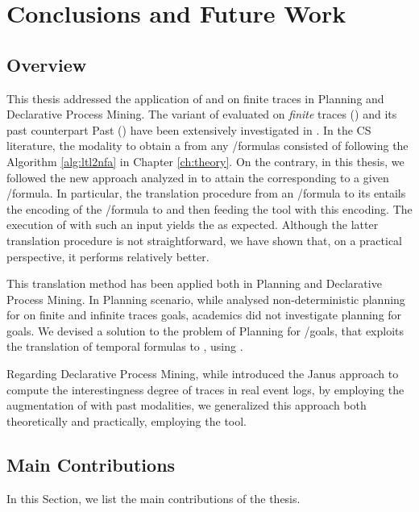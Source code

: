 \chapter{Conclusions and Future Work}\label{ch:conclusion}
\section{Overview}
This thesis addressed the application of \LTL and \PLTL on finite traces in Planning and Declarative Process Mining. The variant of \LTL evaluated on \textit{finite} traces (\LTLf) and its past counterpart  Past \LTL (\PLTL) have been extensively investigated in \cite{de2013linear,lichtenstein1985glory}. In the CS literature, the modality to obtain a \DFA from any \LTLf/\PLTL formulas consisted of following the Algorithm \ref{alg:ltl2nfa} in Chapter \ref{ch:theory}. On the contrary, in this thesis, we followed the new approach analyzed in \cite{zhu2017symbolic, zpv2018} to attain the corresponding \DFA to a given \LTLf/\PLTL formula. In particular, the translation procedure from an \LTLf/\PLTL formula to its \DFA entails the encoding of the \LTLf/\PLTL formula to \FOL and then feeding the \MONA tool with this encoding. The execution of \MONA with such an input yields the \DFA as expected. Although the latter translation procedure is not straightforward, we have shown that, on a practical perspective, it performs relatively better.

This translation method has been applied both in Planning and Declarative Process Mining. In Planning scenario, while \cite{camacho2017non} analysed non-deterministic planning for \LTL on finite and infinite traces goals, academics did not investigate planning for \PLTL goals. We devised a solution to the problem of Planning for \LTLf/\PLTL goals, that exploits the translation of temporal formulas to \DFA, using \LTLfToDFA. 

Regarding Declarative Process Mining, while \cite{cecconi2018interestingness} introduced the Janus approach to compute the interestingness degree of traces in real event logs, by employing the augmentation of \LTLf with past modalities, we generalized this approach both theoretically and practically, employing the \LTLfToDFA tool.
\section{Main Contributions}
In this Section, we list the main contributions of the thesis.

